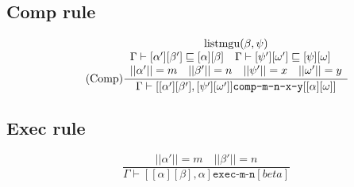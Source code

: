 \documentclass{article}
\newcommand{\op}[3]{[#1] \texttt{#2} [#3]}
\begin{document}
\subsection*{Comp rule}
\begin{equation*}
  \tag{Comp}
  \frac{
    \begin{array}{ll}
      \multicolumn{2}{c}{\text{listmgu}(\beta, \psi)} \\
      \Gamma \vdash \op{\alpha'}{}{\beta'} \sqsubseteq \op{\alpha}{}{\beta} &
      \Gamma \vdash \op{\psi'}{}{\omega'} \sqsubseteq \op{\psi}{}{\omega} \\
      \multicolumn{2}{c}{
        || \alpha' || = m \quad
        || \beta' || = n \quad
        || \psi' || = x \quad
        || \omega' || = y
      } \\
    \end{array}
  }{
    \Gamma \vdash \op{\op{\alpha'}{}{\beta'}, \op{\psi'}{}{\omega'}}{comp-m-n-x-y}{\op{\alpha}{}{\omega}}
  }
\end{equation*}

\subsection*{Exec rule}
\begin{equation*}
  \tag{Exec}
  \frac{
      || \alpha' || = m \quad
      || \beta' || = n
  }{
    \Gamma \vdash \op{\op{\alpha}{}{\beta} , \alpha}{exec-m-n}{beta}
  }
\end{equation*}
\end{document}
